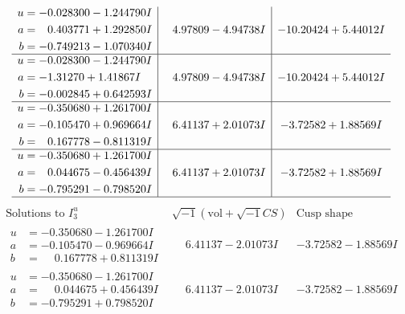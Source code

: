 \documentclass[1p]{elsarticle_modified}
\theoremstyle{definition}
\newcommand{\I}{\sqrt{-1}}
\begin{document}
$$\begin{array}{c|c|c}
\begin{aligned}
u &= -0.028300 - 1.244790 I \\
a &= \phantom{-}0.403771 + 1.292850 I \\
b &= -0.749213 - 1.070340 I\end{aligned}
 & \phantom{-}4.97809 - 4.94738 I & -10.20424 + 5.44012 I \\ \hline\begin{aligned}
u &= -0.028300 - 1.244790 I \\
a &= -1.31270 + 1.41867 I \\
b &= -0.002845 + 0.642593 I\end{aligned}
 & \phantom{-}4.97809 - 4.94738 I & -10.20424 + 5.44012 I \\ \hline\begin{aligned}
u &= -0.350680 + 1.261700 I \\
a &= -0.105470 + 0.969664 I \\
b &= \phantom{-}0.167778 - 0.811319 I\end{aligned}
 & \phantom{-}6.41137 + 2.01073 I & -3.72582 + 1.88569 I \\ \hline\begin{aligned}
u &= -0.350680 + 1.261700 I \\
a &= \phantom{-}0.044675 - 0.456439 I \\
b &= -0.795291 - 0.798520 I\end{aligned}
 & \phantom{-}6.41137 + 2.01073 I & -3.72582 + 1.88569 I\\
 \hline 
 \end{array}$$\newpage$$\begin{array}{c|c|c}  
\text{Solutions to }I^u_{3}& \I (\text{vol} + \sqrt{-1}CS) & \text{Cusp shape}\\
 \hline 
\begin{aligned}
u &= -0.350680 - 1.261700 I \\
a &= -0.105470 - 0.969664 I \\
b &= \phantom{-}0.167778 + 0.811319 I\end{aligned}
 & \phantom{-}6.41137 - 2.01073 I & -3.72582 - 1.88569 I \\ \hline\begin{aligned}
u &= -0.350680 - 1.261700 I \\
a &= \phantom{-}0.044675 + 0.456439 I \\
b &= -0.795291 + 0.798520 I\end{aligned}
 & \phantom{-}6.41137 - 2.01073 I & -3.72582 - 1.88569 I \\ \hline\begin{aligned}

\end{aligned}
\end{array}$$
\end{document}
